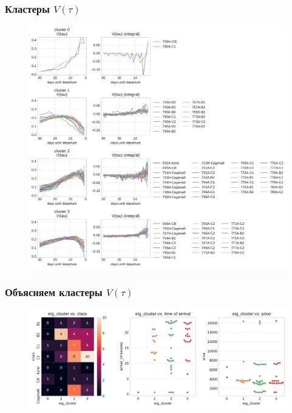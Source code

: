 \documentclass[11pt,aspectratio=169]{beamer}
\begin{document}
\begin{frame}
    \frametitle{Кластеры $V(\tau)$}

    \begin{figure}
        \centering
        \includegraphics[height=0.92\textheight]{../data/figures/eigenvector_clusters.pdf}
    \end{figure}

\end{frame}


\begin{frame}
    \frametitle{Объясняем кластеры $V(\tau)$}

    \begin{figure}
        \centering
        \includegraphics[width=\textwidth]{../data/figures/explaining_eigenvector_clusters.pdf}
    \end{figure}

\end{frame}
\end{document}
